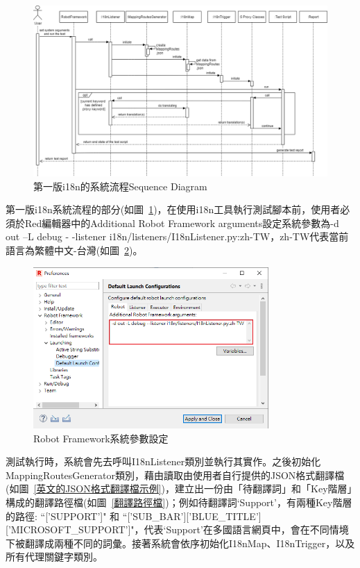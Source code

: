 \begin{figure}[H]
    \includegraphics[width= 1.1\textwidth]{../UML/i18n sequence diagram-第一版i18n系統流程.png}
    \caption{第一版i18n的系統流程Sequence Diagram}
    \label{1stI18nSequenceDiagram}
\end{figure}
第一版i18n系統流程的部分(如圖~\ref{1stI18nSequenceDiagram})，在使用i18n工具執行測試腳本前，使用者必須於Red編輯器\cite{red}中的Additional Robot Framework arguments設定系統參數為-d out –L debug - -listener i18n/listeners/I18nListener.py:zh-TW，zh-TW代表當前語言為繁體中文-台灣(如圖~\ref{rfSysArgsSetting})。

\begin{figure}[H]
    \centering
    \includegraphics[width= 0.8\textwidth]{../論文截圖/3-1-3-1 設定系統參數.png}
    \caption{Robot Framework系統參數設定}
    \label{rfSysArgsSetting}
\end{figure}
測試執行時，系統會先去呼叫I18nListener類別並執行其實作。之後初始化MappingRoutesGenerator類別，藉由讀取由使用者自行提供的JSON格式翻譯檔(如圖~\ref{英文的JSON格式翻譯檔示例})，建立出一份由「待翻譯詞」和「Key階層」構成的翻譯路徑檔(如圖~\ref{翻譯路徑檔})；例如待翻譯詞‘Support’，有兩種Key階層的路徑: “['SUPPORT']" 和 “['SUB\_BAR']['BLUE\_TITLE']['MICROSOFT\_SUPPORT']"，代表‘Support’在多國語言網頁中，會在不同情境下被翻譯成兩種不同的詞彙。接著系統會依序初始化I18nMap、I18nTrigger，以及所有代理關鍵字類別。

